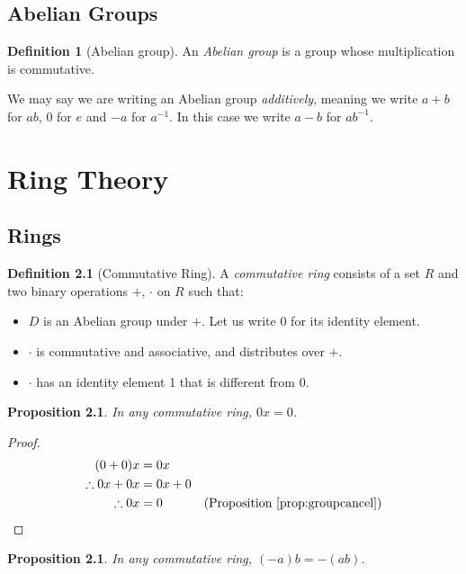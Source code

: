 \documentclass{book}
\let\qed\relax
\newtheorem{prop}[ax]{Proposition}
\theoremstyle{definition}
\newtheorem{df}[ax]{Definition}
\begin{document}
\section{Abelian Groups}

\begin{df}[Abelian group]
An \emph{Abelian group} is a group whose multiplication is commutative.

We may say we are writing an Abelian group \emph{additively}, meaning we write $a + b$ for $ab$, $0$ for $e$ and $-a$ for $a^{-1}$. In this case we write $a-b$ for $ab^{-1}$.
\end{df}

\chapter{Ring Theory}

\section{Rings}

\begin{df}[Commutative Ring]
A \emph{commutative ring} consists of a set $R$ and two binary operations $+$, $\cdot$ on $R$ such that:
\begin{itemize}
\item
$D$ is an Abelian group under $+$. Let us write 0 for its identity element.
\item
$\cdot$ is commutative and associative, and distributes over $+$.
\item
$\cdot$ has an identity element 1 that is different from 0.
\end{itemize}
\end{df}

\begin{prop}
\label{prop:timeszero}
In any commutative ring, $0x = 0$.
\end{prop}

\begin{proof}
\pf
\begin{align*}
(0+0)x & = 0x \\
\therefore 0x + 0x & = 0x + 0 \\
\therefore 0x & = 0 & (\text{Proposition \ref{prop:groupcancel}}) \qed
\end{align*}
\end{proof}

\begin{prop}
In any commutative ring, $(-a)b = -(ab)$.
\end{prop}
\end{document}
